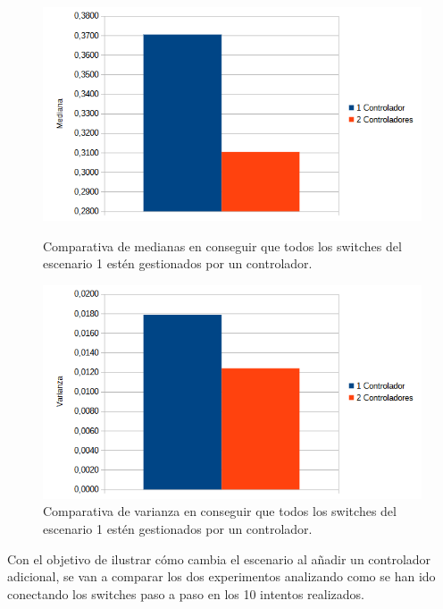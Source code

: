\documentclass[a4paper, 12pt]{book}
\begin{document}
 	 
 	 \begin{figure}[H]
 	 	\centering
 	 	\begin{minipage}[b]{0.45\textwidth}
 	 		\centering
 	 		\includegraphics[width=\textwidth]{img/comparativamedianabucle.png}
 	 		\caption{Comparativa de medianas en conseguir que todos los switches del escenario 1 estén gestionados por un controlador.}
 	 		\label{fig:mediana}
 	 	\end{minipage}
 	 	\hfill
 	 	\begin{minipage}[b]{0.45\textwidth}
 	 		\centering
 	 		\includegraphics[width=\textwidth]{img/comparativavarianzabucle.png}
 	 		\caption{Comparativa de varianza en conseguir que todos los switches del escenario 1 estén gestionados por un controlador.}
 	 		\label{fig:varianza}
 	 	\end{minipage}
 	 \end{figure}
 	 	
 
 	
 	Con el objetivo de ilustrar cómo cambia el escenario al añadir un controlador adicional, se van a comparar los dos experimentos analizando como se han ido conectando los switches paso a paso en los 10 intentos realizados.
 	
\end{document}
